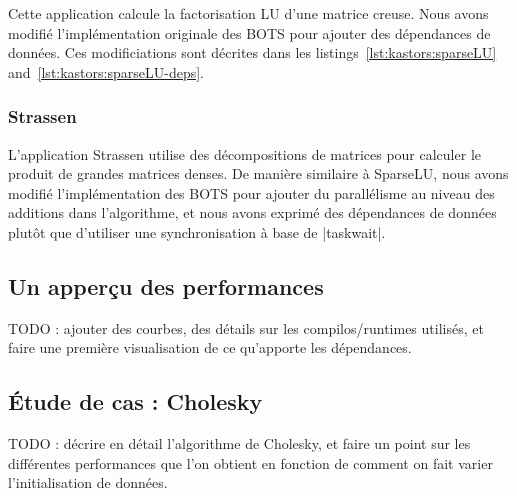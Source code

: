 Cette application calcule la factorisation LU d'une matrice creuse.
Nous avons modifié l'implémentation originale des BOTS pour ajouter des dépendances de données.
Ces modificiations sont décrites dans les listings~\ref{lst:kastors:sparseLU} and~\ref{lst:kastors:sparseLU-deps}.

\subsubsection{Strassen}

L'application Strassen utilise des décompositions de matrices pour calculer le produit de grandes matrices denses.
De manière similaire à SparseLU, nous avons modifié l'implémentation des BOTS pour ajouter du parallélisme au niveau des additions dans l'algorithme, et nous avons exprimé des dépendances de données plutôt que d'utiliser une synchronisation à base de |taskwait|.


\subsection{Un apperçu des performances}

TODO : ajouter des courbes, des détails sur les compilos/runtimes utilisés, et faire une première visualisation de ce qu'apporte les dépendances.

\subsection{Étude de cas : Cholesky}

TODO : décrire en détail l'algorithme de Cholesky, et faire un point sur les différentes performances que l'on obtient en fonction de comment on fait varier l'initialisation de données.


